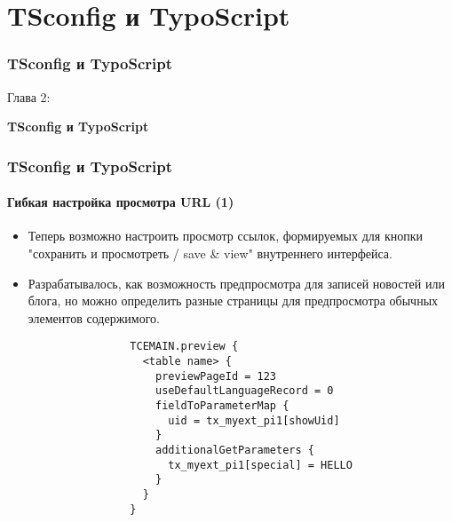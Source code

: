 %

\section{TSconfig и TypoScript}
\begin{frame}[fragile]
	\frametitle{TSconfig и TypoScript}

	\begin{center}\huge{Глава 2:}\end{center}
	\begin{center}\huge{\color{typo3darkgrey}\textbf{TSconfig и TypoScript}}\end{center}

\end{frame}

\begin{frame}[fragile]
	\frametitle{TSconfig и TypoScript}
	\framesubtitle{Гибкая настройка просмотра URL (1)}

	\lstset{basicstyle=\tiny\ttfamily}

	\begin{itemize}

		\item Теперь возможно настроить просмотр ссылок, формируемых для кнопки\newline
			"сохранить и просмотреть / save \& view" внутреннего интерфейса.

		\item Разрабатывалось, как возможность предпросмотра для записей новостей или блога,
		 но можно определить разные страницы для предпросмотра обычных элементов содержимого.

			\begin{lstlisting}
				TCEMAIN.preview {
				  <table name> {
				    previewPageId = 123
				    useDefaultLanguageRecord = 0
				    fieldToParameterMap {
				      uid = tx_myext_pi1[showUid]
				    }
				    additionalGetParameters {
				      tx_myext_pi1[special] = HELLO
				    }
				  }
				}
			\end{lstlisting}

	\end{itemize}

\end{frame}

